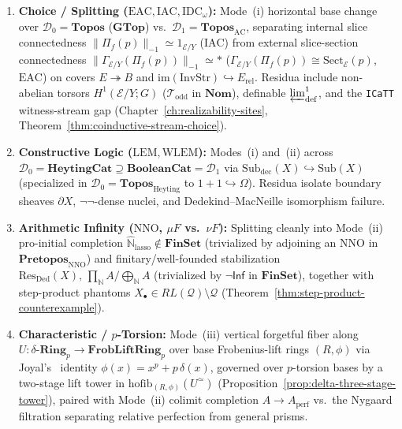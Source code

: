 \documentclass[10pt,twoside,openright]{book}
\theoremstyle{crmplain}
\theoremstyle{crmdef}
\theoremstyle{crmremark}
\begin{document}
\begin{enumerate}[label=\textbf{Axis \Roman*.},leftmargin=2.6em]
  \item \textbf{Choice / Splitting ($\mathrm{EAC}, \mathrm{IAC}, \mathrm{IDC}_\omega$):} Mode~(i) horizontal base change over $\mathcal{D}_0 = \mathbf{Topos}$ ($\mathbf{GTop}$) vs.\ $\mathcal{D}_1 = \mathbf{Topos}_{\mathrm{AC}}$, separating internal slice connectedness $\|\Pi_f(p)\|_{-1} \simeq 1_{\mathcal{E}/Y}$ ($\mathrm{IAC}$) from external slice-section connectedness $\|\Gamma_{\mathcal{E}/Y}(\Pi_f(p))\|_{-1} \simeq *$ ($\Gamma_{\mathcal{E}/Y}(\Pi_f(p)) \cong \mathrm{Sect}_{\mathcal{E}}(p)$, $\mathrm{EAC}$) on covers $E \twoheadrightarrow B$ and $\mathrm{im}(\mathrm{InvStr}) \hookrightarrow E_{\mathrm{rel}}$. Residua include non-abelian torsors $H^1(\mathcal{E}/Y; G)$ ($\mathcal{T}_{\mathrm{odd}}$ in $\mathbf{Nom}$), definable $\varprojlim^1_{\mathrm{def}}$, and the \texttt{ICaTT} witness-stream gap (Chapter~\ref{ch:realizability-sites}, Theorem~\ref{thm:coinductive-stream-choice}).
  \item \textbf{Constructive Logic ($\mathrm{LEM}, \mathrm{WLEM}$):} Modes~(i) and~(ii) across $\mathcal{D}_0 = \mathbf{HeytingCat} \supseteq \mathbf{BooleanCat} = \mathcal{D}_1$ via $\mathrm{Sub}_{\mathrm{dec}}(X) \hookrightarrow \mathrm{Sub}(X)$ (specialized in $\mathcal{D}_0 = \mathbf{Topos}_{\mathrm{Heyting}}$ to $1+1 \hookrightarrow \Omega$). Residua isolate boundary sheaves $\partial X$, $\neg\neg$-dense nuclei, and Dedekind--MacNeille isomorphism failure.
  \item \textbf{Arithmetic Infinity ($\mathrm{NNO}$, $\mu F$ vs.\ $\nu F$):} Splitting cleanly into Mode~(ii) pro-initial completion $\widehat{\mathbb{N}}_{\mathrm{lasso}} \notin \mathbf{FinSet}$ (trivialized by adjoining an $\mathrm{NNO}$ in $\mathbf{Pretopos}_{\mathrm{NNO}}$) and finitary/well-founded stabilization $\mathrm{Res}_{\mathrm{Ded}}(X),\, \prod_{\mathbb{N}} A / \bigoplus_{\mathbb{N}} A$ (trivialized by $\neg\mathsf{Inf}$ in $\mathbf{FinSet}$), together with step-product phantoms $X_\bullet \in RL(\mathcal{Q}) \setminus \mathcal{Q}$ (Theorem~\ref{thm:step-product-counterexample}).
  \item \textbf{Characteristic / $p$-Torsion:} Mode~(iii) vertical forgetful fiber along $U : \delta\text{-}\mathbf{Ring}_p \to \mathbf{FrobLiftRing}_p$ over base Frobenius-lift rings $(R, \phi)$ via Joyal's~\cite{Joyal85} identity $\phi(x) = x^p + p\,\delta(x)$, governed over $p$-torsion bases by a two-stage lift tower in $\mathrm{hofib}_{(R,\phi)}(U^{\simeq})$ (Proposition~\ref{prop:delta-three-stage-tower}), paired with Mode~(ii) colimit completion $A \to A_{\mathrm{perf}}$ vs.\ the Nygaard filtration separating relative perfection from general prisms.

\end{enumerate}
\end{document}

